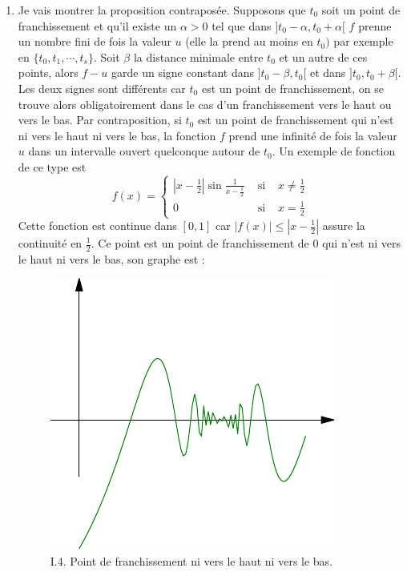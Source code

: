 \begin{enumerate}
  \item  Je vais montrer la proposition contrapos{\'e}e. Supposons que $t_{0}$ soit un point de franchissement et qu'il existe un $\alpha >0$ tel que dans
  $] t_{0}-\alpha ,t_{0}+\alpha [ $ $f$ prenne un nombre fini de fois la valeur $u$ (elle la prend au moins en $t_{0})$ par exemple en $\{ t_{0},t_{1},\cdots ,t_{s}\}$.
  Soit $\beta $ la distance minimale entre $t_{0}$ et un autre de ces points, alors $f-u$ garde un signe constant dans $] t_{0}-\beta ,t_{0}[ $ et dans $]t_{0},t_{0}+\beta [ $.
  Les deux signes sont diff{\'e}rents car $t_{0}$ est un point de franchissement, on se trouve alors obligatoirement dans le cas d'un franchissement vers le haut ou vers le bas.\newline
  Par contraposition, si $t_{0}$ est un point de franchissement qui n'est ni vers le haut ni vers le bas, la fonction $f$ prend une infinit{\'e} de fois la valeur $u$ dans un intervalle ouvert quelconque autour de $t_{0}$. Un exemple de fonction de ce type est
\begin{displaymath}
  f(x) =
  \left\lbrace
    \begin{align*}
      | x-\frac{1}{2}| \sin \frac{1}{x-\frac{1}{2}} & \text{ si } & x\neq \frac{1}{2} \\
      0                                             & \text{ si } & x=\frac{1}{2}
    \end{align*}
  \right.
\end{displaymath}
Cette fonction est continue dans $[ 0,1] $ car $| f(x)| \leq | x-\frac{1}{2}| $ assure la continuit{\'e} en $\frac{1}{2}.$ Ce point est un point de franchissement de $0$ qui
n'est ni vers le haut ni vers le bas, son graphe est :
\begin{figure}
   \centering
   \includegraphics{Cfranch_1.pdf}
   \caption{I.4. Point de franchissement ni vers le haut ni vers le bas.}
\end{figure}


\end{enumerate}
